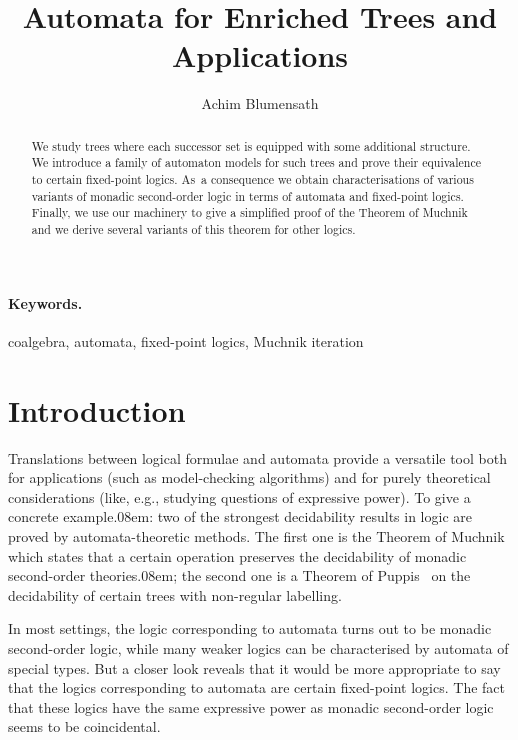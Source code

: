 \documentclass[10pt, fleqn]{scrartcl}
\newcommand*{\?}{\kern .08em}
\begin{document}
\title{Automata for Enriched Trees and Applications}
\author{Achim Blumensath}
\maketitle

\begin{abstract}
We study trees where each successor set is equipped with some additional structure.
We introduce a family of automaton models for such trees and prove their equivalence to
certain fixed-point logics. As~a consequence we obtain characterisations of various
variants of monadic second-order logic in terms of automata and fixed-point logics.
Finally, we use our machinery to give a simplified proof of the Theorem of Muchnik
and we derive several variants of this theorem for other logics.
\end{abstract}

\paragraph{Keywords.} coalgebra, automata, fixed-point logics, Muchnik iteration


\section{Introduction}   %


Translations between logical formulae and automata provide a versatile tool both for
applications (such as model-checking algorithms) and for purely theoretical considerations
(like, e.g., studying questions of expressive power).
To give a concrete example\?: two of the strongest decidability results in logic are proved
by automata-theoretic methods. The first one is the Theorem of Muchnik~\cite{Walukiewicz02}
which states that a certain operation preserves the decidability of monadic second-order
theories\?; the second one is a Theorem of Puppis~\cite{Puppis10} on the decidability of
certain trees with non-regular labelling.

In most settings, the logic corresponding to automata turns out to be
monadic second-order logic, while many weaker logics can be characterised by automata
of special types. But a closer look reveals that it would be more appropriate to
say that the logics corresponding to automata are certain fixed-point logics.
The fact that these logics have the same expressive power as monadic second-order logic
seems to be coincidental.
\end{document}
